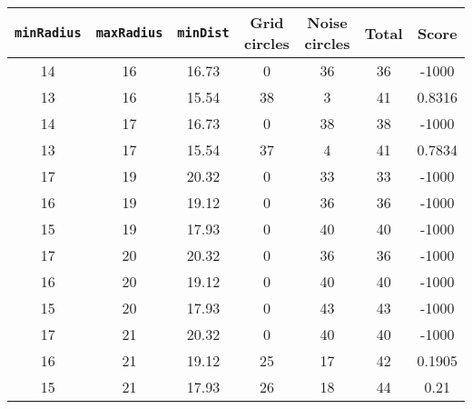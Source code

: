 \documentclass[letterpaper, 12pt]{article}
\begin{document}
\begin{longtable}{|c|c|c|c|c|c|c|}
\hline
\textbf{\texttt{minRadius}} & \textbf{\texttt{maxRadius}} & \textbf{\texttt{minDist}} & \textbf{Grid circles} & \textbf{Noise circles} & \textbf{Total} & \textbf{Score} \\
\hline
14 & 16 & 16.73 & 0 & 36 & 36 & -1000 \\
\hline
13 & 16 & 15.54 & 38 & 3 & 41 & 0.8316 \\
\hline
14 & 17 & 16.73 & 0 & 38 & 38 & -1000 \\
\hline
13 & 17 & 15.54 & 37 & 4 & 41 & 0.7834 \\
\hline
17 & 19 & 20.32 & 0 & 33 & 33 & -1000 \\
\hline
16 & 19 & 19.12 & 0 & 36 & 36 & -1000 \\
\hline
15 & 19 & 17.93 & 0 & 40 & 40 & -1000 \\
\hline
17 & 20 & 20.32 & 0 & 36 & 36 & -1000 \\
\hline
16 & 20 & 19.12 & 0 & 40 & 40 & -1000 \\
\hline
15 & 20 & 17.93 & 0 & 43 & 43 & -1000 \\
\hline
17 & 21 & 20.32 & 0 & 40 & 40 & -1000 \\
\hline
16 & 21 & 19.12 & 25 & 17 & 42 & 0.1905 \\
\hline
15 & 21 & 17.93 & 26 & 18 & 44 & 0.21 \\
\hline
\end{longtable}
\end{document}
